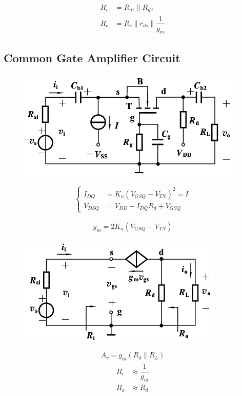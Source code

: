 \begin{equation*}
  \begin{aligned}
    R_i &= R_{g1} \parallel R_{g2} \\
    R_o &= R_s \parallel r_{ds} \parallel \dfrac{1}{g_m} 
  \end{aligned}
\end{equation*}


\subsection{Common Gate Amplifier Circuit}

\begin{figure}[H]
  \centering
  \includegraphics[width=0.5\linewidth]{figures/MOSFET-Common-G}
  \label{fig:}
\end{figure}

\begin{equation*}
  \left\{
  \begin{aligned}
    I_{DQ} &= K_n \left( V_{GSQ} - V_{TN} \right)^2 = I\\
    V_{DSQ} &= V_{DD} - I_{DQ} R_d + V_{GSQ}
  \end{aligned}
  \right.
\end{equation*}

\begin{equation*}
  \begin{aligned}
    g_m = 2 K_n \left( V_{GSQ} - V_{TN} \right)
  \end{aligned}
\end{equation*}

\begin{figure}[H]
  \centering
  \includegraphics[width=0.5\linewidth]{figures/MOSFET-Common-Gs}
  \label{fig:}
\end{figure}

\begin{equation*}
  \begin{aligned}
    A_v = g_m \left( R_d \parallel R_L \right)
  \end{aligned}
\end{equation*}
\begin{equation*}
  \begin{aligned}
    R_i &\approx \dfrac{1}{g_m} \\
    R_o &\approx R_d
  \end{aligned}
\end{equation*}




